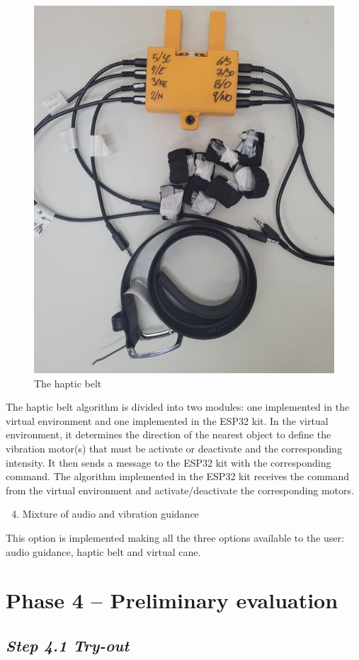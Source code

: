         \begin{figure}[!htb]
            \centering
            \includegraphics[width = 0.5\linewidth]{Metodologia/Cinto Haptico.png}
            \caption{The haptic belt}
            \label{fig:cinto_haptico}
        \end{figure}

        The haptic belt algorithm is divided into two modules: one implemented in the virtual environment and one implemented in the ESP32 kit. In the virtual environment, it determines the direction of the nearest object to define the vibration motor(s) that must be activate or deactivate and the corresponding intensity. It then sends a message to the ESP32 kit with the corresponding command. The algorithm implemented in the ESP32 kit receives the command from the virtual environment and activate/deactivate the corresponding motors.

        \begin{enumerate} [label = \Alph*)]
            \setcounter{enumi}{3}
            \item Mixture of audio and vibration guidance
        \end{enumerate}

        This option is implemented making all the three options available to the user: audio guidance, haptic belt and virtual cane. 


\section{Phase 4 – Preliminary evaluation}
\label{sec:tests_phase}
        
\subsection*{\textit{Step 4.1 Try-out}}

